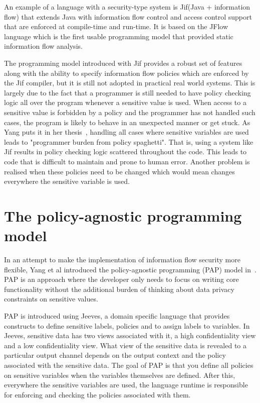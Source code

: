 An example of a language with a security-type system is Jif(Java + information flow)
\cite{jifurl} that extends Java with information flow control and access control support
that are enforced at compile-time and run-time. It is based on the JFlow language
\cite{Jflow} which is the first usable programming model that provided static
information flow analysis.

The programming model introduced with Jif provides a robust set of features along
with the ability to specify information flow policies which are enforced by the Jif
compiler, but it is still not adopted in practical real world systems. This is largely
due to the fact that a programmer is still needed to have policy checking logic
all over the program whenever a sensitive value is used. When access to a sensitive
value is forbidden by a policy and the programmer has not handled such cases, the
program is likely to behave in an unexpected manner or get stuck. As Yang puts it
in her thesis~\cite{YangPhd}, handling all cases where sensitive variables are used
leads to "programmer burden from policy spaghetti". That is, using a system like
Jif results in policy checking logic scattered throughout the code. This leads to
code that is difficult to maintain and prone to human error. Another problem is
realised when these policies need to be changed which would mean changes everywhere
the sensitive variable is used.

\section{The policy-agnostic programming model}
In an attempt to make the implementation of information flow security more flexible,
Yang et al introduced the policy-agnostic programming (PAP) model in~\cite{Jeeves}.
PAP is an approach where the developer only needs to focus on writing core functionality
without the additional burden of thinking about data privacy constraints on sensitive
values.

PAP is introduced using Jeeves, a domain specific language that provides constructs
to define sensitive labels, policies and to assign labels to variables. In Jeeves,
sensitive data has two views associated with it, a high confidentiality view and a
low confidentiality view. What view of the sensitive data is revealed to a particular
output channel depends on the output context and the policy associated with the
sensitive data. The goal of PAP is that you define all policies on sensitive variables
when the variables themselves are defined. After this, everywhere the sensitive variables
are used, the language runtime is responsible for enforcing and checking the policies
associated with them.

